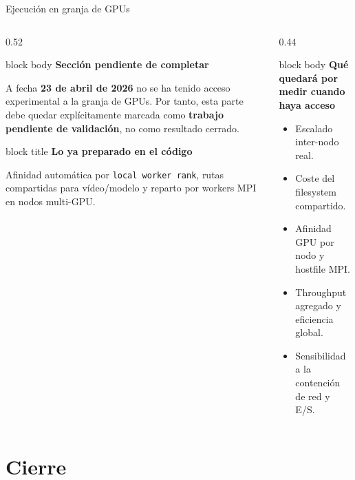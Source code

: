 \documentclass[aspectratio=169,11pt]{beamer}
\newcommand{\callout}[2]{
  \begin{beamercolorbox}[wd=\linewidth,sep=0.6em,rounded=true,shadow=false]{block title}
    {\bfseries #1}\par
    \vspace{0.15em}
    {\footnotesize #2}
  \end{beamercolorbox}
}
\newcommand{\pendingbox}[2]{
  \begin{beamercolorbox}[wd=\linewidth,sep=0.75em,rounded=true,shadow=false]{block body}
    {\bfseries\color{Terracotta}#1}\par
    \vspace{0.2em}
    {\footnotesize #2}
  \end{beamercolorbox}
}
\begin{document}
\begin{frame}{Ejecución en granja de GPUs}
  \small
  \begin{columns}[T,totalwidth=\textwidth]
    \begin{column}{0.52\textwidth}
      \pendingbox{Sección pendiente de completar}{
        A fecha \textbf{23 de abril de 2026} no se ha tenido acceso experimental a la granja de GPUs. Por tanto, esta parte debe quedar explícitamente marcada como \textbf{trabajo pendiente de validación}, no como resultado cerrado.}

      \vspace{0.3em}
      \callout{Lo ya preparado en el código}{
        Afinidad automática por \texttt{local worker rank}, rutas compartidas para vídeo/modelo y reparto por workers MPI en nodos multi-GPU.}
    \end{column}
    \begin{column}{0.44\textwidth}
      \begin{beamercolorbox}[wd=\linewidth,sep=0.7em,rounded=true,shadow=false]{block body}
        {\bfseries Qué quedará por medir cuando haya acceso}\par
        \vspace{0.15em}
        \begin{itemize}
          \item Escalado inter-nodo real.
          \item Coste del filesystem compartido.
          \item Afinidad GPU por nodo y hostfile MPI.
          \item Throughput agregado y eficiencia global.
          \item Sensibilidad a la contención de red y E/S.
        \end{itemize}
      \end{beamercolorbox}
    \end{column}
  \end{columns}
\end{frame}

\section{Cierre}
\end{document}
